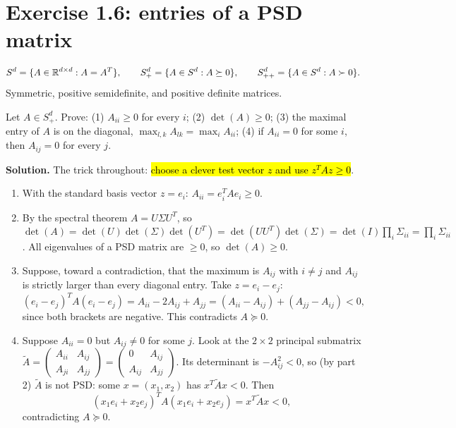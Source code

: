 \section{Exercise 1.6: entries of a PSD matrix}

\begin{defn}
\[ S^d=\{A\in\mathbb{R}^{d\times d}:A=A^T\},\qquad S^d_+=\{A\in S^d:A\succeq0\},\qquad S^d_{++}=\{A\in S^d:A\succ0\}. \]
Symmetric, positive semidefinite, and positive definite matrices.
\end{defn}

\begin{example}
Let $A\in S^d_+$. Prove: (1) $A_{ii}\ge0$ for every $i$; (2) $\det(A)\ge0$; (3) the maximal entry of $A$ is on the diagonal,
$\max_{l,k}A_{lk}=\max_iA_{ii}$; (4) if $A_{ii}=0$ for some $i$, then $A_{ij}=0$ for every $j$.
\end{example}

\textbf{Solution.} The trick throughout: \hl{choose a clever test vector $z$ and use $z^TAz\ge0$}.
\begin{enumerate}
  \item With the standard basis vector $z=e_i$: $A_{ii} = e_i^TAe_i\ge0$.
  \item By the spectral theorem $A=U\Sigma U^T$, so
        $\det(A) = \det(U)\det(\Sigma)\det(U^T) = \det(UU^T)\det(\Sigma) = \det(I)\prod_i\Sigma_{ii} = \prod_i\Sigma_{ii}$.
        All eigenvalues of a PSD matrix are $\ge0$, so $\det(A)\ge0$.
  \item Suppose, toward a contradiction, that the maximum is $A_{ij}$ with $i\ne j$ and $A_{ij}$ is strictly larger than every diagonal entry.
        Take $z=e_i-e_j$:
        \[ (e_i-e_j)^TA(e_i-e_j) = A_{ii}-2A_{ij}+A_{jj} = (A_{ii}-A_{ij})+(A_{jj}-A_{ij}) < 0, \]
        since both brackets are negative. This contradicts $A\succeq0$.
  \item Suppose $A_{ii}=0$ but $A_{ij}\ne0$ for some $j$. Look at the $2\times2$ principal submatrix
        $\tilde A = \begin{pmatrix}A_{ii}&A_{ij}\\A_{ji}&A_{jj}\end{pmatrix} = \begin{pmatrix}0&A_{ij}\\A_{ij}&A_{jj}\end{pmatrix}$.
        Its determinant is $-A_{ij}^2<0$, so (by part 2) $\tilde A$ is not PSD: some $x=(x_1,x_2)$ has $x^T\tilde Ax<0$. Then
        \[ (x_1e_i+x_2e_j)^TA(x_1e_i+x_2e_j) = x^T\tilde Ax<0, \]
        contradicting $A\succeq0$.
\end{enumerate}

